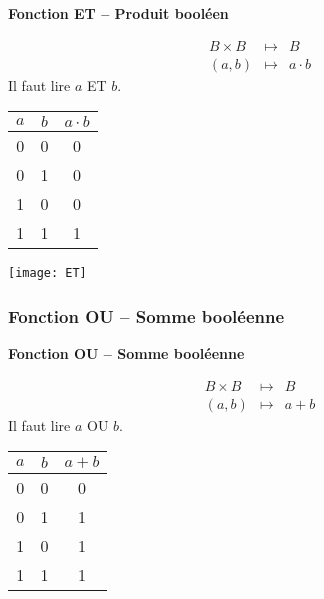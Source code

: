 \begin{defi}
\textbf{Fonction ET -- Produit booléen}

\begin{minipage}[c]{.45\linewidth}
\begin{eqnarray*}
B \times B &\longmapsto& B\\
(a,b) &\longmapsto& a \cdot b
\end{eqnarray*}
Il faut lire $a$ ET $b$. 
\end{minipage} \hfill
\begin{minipage}[c]{.45\linewidth}
\begin{center}
\begin{tabular}{|c|c||c|}
\hline
$a$ & $b$ & $a\cdot b$ \\
\hline
0 & 0 & 0 \\ \hline
0 & 1 & 0 \\ \hline
1 & 0 & 0 \\ \hline
1 & 1 & 1 \\ \hline
\end{tabular}
\end{center}
\end{minipage}
\end{defi}

\begin{exemple}

\begin{center}
\texttt{[image: ET]}
\end{center}

\end{exemple}


\subsubsection{Fonction OU -- Somme booléenne}


\begin{defi}
\textbf{Fonction OU -- Somme booléenne}

\begin{minipage}[c]{.45\linewidth}
\begin{eqnarray*}
B \times B &\longmapsto& B\\
(a,b) &\longmapsto& a + b
\end{eqnarray*}
Il faut lire $a$ OU $b$. 
\end{minipage} \hfill
\begin{minipage}[c]{.45\linewidth}
\begin{center}
\begin{tabular}{|c|c||c|}
\hline
$a$ & $b$ & $a+ b$ \\
\hline
0 & 0 & 0 \\ \hline
0 & 1 & 1 \\ \hline
1 & 0 & 1 \\ \hline
1 & 1 & 1 \\ \hline
\end{tabular}
\end{center}
\end{minipage}
\end{defi}

